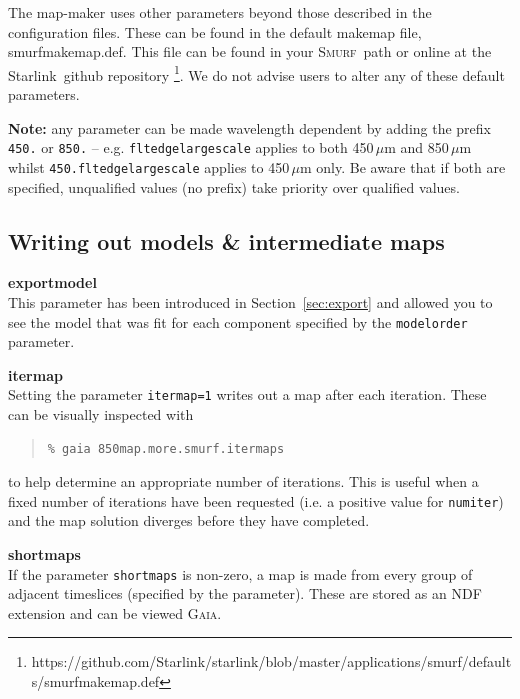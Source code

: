 \documentclass[twoside,11pt]{article}
\newcommand{\htmladdnormallink}[2]{#1}
\newcommand{\htmlref}[2]{#1}
\newcommand{\latex}[1]{#1}
\newcommand{\latexhtml}[2]{#1}
\newcommand{\xref}[3]{#1}
\newcommand{\xlabel}[1]{}
\renewcommand{\_}{\texttt{\symbol{95}}}
\newenvironment{myquote}{\begin{quote}\begin{small}}{\end{small}\end{quote}}
\newcommand{\starlink}{\htmladdnormallink{Starlink}{http://starlink.jach.hawaii.edu}}
\newcommand{\gaia}{\xref{\textsc{Gaia}}{sun214}{}}
\newcommand{\smurf}{\xref{\textsc{Smurf}}{sun258}{}}
\newcommand{\cref}[3]{\latexhtml{#1~\ref{#2}}{\htmlref{#3}{#2}}}
\begin{document}
The map-maker uses other parameters beyond those described in the
configuration files. These can be found in the default makemap file,
smurf\_makemap.def. This file can be found in your \smurf\ path or
online at the \starlink\
\htmladdnormallink{github
repository}{https://github.com/Starlink/starlink/blob/master/applications/smurf/defaults/smurf\_makemap.def}
\latex{\footnote{https://github.com/Starlink/starlink/blob/master/applications/smurf/defaults/smurf\_makemap.def}}.
We do not advise users to alter any of these default parameters.

\textbf{Note:} any parameter can be made wavelength dependent by
adding the prefix \texttt{450.} or \texttt{850.} -- e.g.
\texttt{flt\_edge\_largescale} applies to both 450\,$\mu$m and
850\,$\mu$m whilst \texttt{450.flt\_edge\_largescale} applies to
450\,$\mu$m only. Be aware that if both are specified, unqualified
values (no prefix) take priority over qualified values.

\subsection{\xlabel{inter}Writing out models \& intermediate maps}
\textbf{exportmodel}\\
This parameter has been introduced in
\cref{Section}{sec:export}{Exporting individual models} and
allowed you to see the model that was fit for each component
specified by the \texttt{modelorder} parameter.

{\bf itermap}\\
Setting the parameter \texttt{itermap=1} writes out a map after each
iteration. These can be visually inspected with

\begin{myquote}
\begin{verbatim}
% gaia 850map.more.smurf.itermaps
\end{verbatim}
\end{myquote}
to help determine an appropriate number of iterations. This is useful
when a fixed number of iterations have been requested (i.e. a positive
value for \texttt{numiter}) and the map solution diverges before
they have completed.

\textbf{shortmaps}\\
If the parameter \texttt{shortmaps} is non-zero, a map is made from
every group of adjacent timeslices (specified by the parameter).
These are stored as an NDF extension and can be viewed \gaia.
\end{document}
